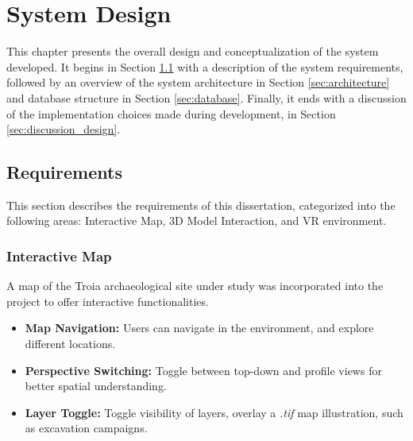 
%
\chapter{System Design}
\label{cha:system_design}
This chapter presents the overall design and conceptualization of the system developed. It begins in Section \ref{sec:requirements} with a description of the system requirements, followed by an overview of the system architecture in Section \ref{sec:architecture} and database structure in Section \ref{sec:database}.
Finally, it ends with a discussion of the implementation choices made during development, in Section \ref{sec:discussion_design}.

\section{Requirements}
\label{sec:requirements}

This section describes the requirements of this dissertation, categorized into the following areas: Interactive Map, \gls{3D} Model Interaction, and \gls{VR} environment.


\subsection*{Interactive Map}
A map of the Troia archaeological site under study was incorporated into the project to offer interactive functionalities.
\begin{itemize}
    \item \textbf{Map Navigation:} Users can navigate in the environment, and explore different locations.
    \item \textbf{Perspective Switching:} Toggle between top-down and profile views for better spatial understanding.
    \item \textbf{Layer Toggle:} Toggle visibility of layers, overlay a \textit{.tif} map illustration, such as excavation campaigns.
\end{itemize}

